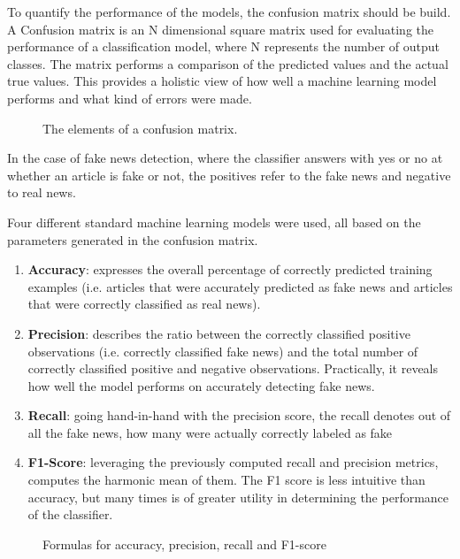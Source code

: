 To quantify the performance of the models, the confusion matrix should be build. A Confusion matrix is an N dimensional square matrix used for evaluating the performance of a classification model, where N represents the number of output classes. The matrix performs a comparison of the predicted values and the actual true values. This provides a holistic view of how well a machine learning model performs and what kind of errors were made. 

\begin{figure}[h]
  \centering
  \caption{The elements of a confusion matrix.}
\end{figure}

In the case of fake news detection, where the classifier answers with yes or no at whether an article is fake or not, the positives refer to the fake news and negative to real news.

Four different standard machine learning models were used, all based on the parameters generated in the confusion matrix.
\begin{enumerate}
  \item \textbf{Accuracy}: expresses the overall percentage of correctly predicted training examples (i.e. articles that were accurately predicted as fake news and articles that were correctly classified as real news).
  \item \textbf{Precision}: describes the ratio between the correctly classified positive observations (i.e. correctly classified fake news) and the total number of correctly classified positive and negative observations. Practically, it reveals how well the model performs on accurately detecting fake news. 
  \item \textbf{Recall}: going hand-in-hand with the precision score, the recall denotes out of all the fake news, how many were actually correctly labeled as fake
  \item \textbf{F1-Score}: leveraging the previously computed recall and precision metrics, computes the harmonic mean of them. The F1 score is less intuitive than accuracy, but many times is of greater utility in determining the performance of the classifier.
\end{enumerate}

\begin{figure}[h]
  \centering
  \caption{Formulas for accuracy, precision, recall and F1-score}
\end{figure}

